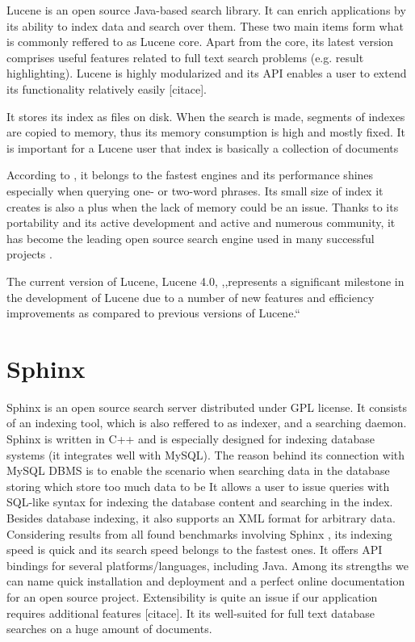 Lucene \cite{LuceneHome} is an open source Java-based search
library. It can enrich applications by its ability to index data and
search over them. These two main items form what is commonly reffered
to as Lucene core. Apart from the core, its latest version comprises
useful features related to full text search problems (e.g. result
highlighting). Lucene is highly modularized and its API enables a
user to extend its functionality relatively easily {[}citace{]}. 

It stores its index as files on disk. When the search is made, segments
of indexes are copied to memory, thus its memory consumption is high
and mostly fixed. It is important for a Lucene user that index is
basically a collection of documents 

According to \cite{MiddletonBaeza,ComparisonLuceneIndri}, it
belongs to the fastest engines and its performance shines especially
when querying one- or two-word phrases. Its small size of index it
creates is also a plus when the lack of memory could be an issue.
Thanks to its portability and its active development and active and
numerous community, it has become the leading open source search engine
used in many successful projects \cite{LuceneWhoUses}.

The current version of Lucene, Lucene 4.0, ,,represents a significant
milestone in the development of Lucene due to a number of new features
and efficiency improvements as compared to previous versions of Lucene.``
\cite{ApacheLucene4}


\section{Sphinx}

Sphinx \cite{SphinxHome} is an open source search server distributed
under GPL license. 
It consists of an indexing tool, which is also reffered to as indexer, and a searching daemon. 
Sphinx is written in C++ and is especially designed for indexing database systems (it integrates well with MySQL).
The reason behind its connection with MySQL DBMS is to enable the scenario when searching data in the database  storing which store too much data to be 
It allows a user to issue queries with SQL-like syntax for indexing the database content and searching in the index.
Besides database indexing, it also supports an XML format for arbitrary data. 
Considering results from all found benchmarks involving Sphinx \cite{IndriHome,MiddletonBaeza,BenchmarkLuceneSphinxNewer,BenchmarkMysqlLuceneSphinx}, its indexing speed is quick and its search speed belongs to the fastest ones. 
It offers API bindings for several platforms/languages, including
Java. 
Among its strengths we can name quick installation and deployment
and a perfect online documentation for an open source project. 
Extensibility is quite an issue if our application requires additional features
{[}citace{]}. 
It its well-suited for full text database searches on
a huge amount of documents.



